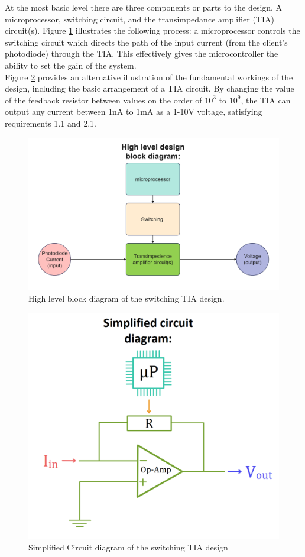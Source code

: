 \documentclass[conference]{IEEEtran}
\begin{document}
At the most basic level there are three components or parts to the design. A microprocessor, switching circuit, and the transimpedance amplifier (TIA) circuit(s). Figure \ref{fig:1} illustrates the following process: a microprocessor controls the switching circuit which directs the path of the input current (from the client’s photodiode) through the TIA. This effectively gives the microcontroller the ability to set the gain of the system. \\

Figure \ref{fig:2} provides an alternative illustration of the fundamental workings of the design, including the basic arrangement of a TIA circuit. By changing the value of the feedback resistor between values on the order of $10^3$ to $10^9$, the TIA can output any current between 1nA to 1mA as a 1-10V voltage, satisfying requirements 1.1 and 2.1.

\begin{figure}
    \centering
    \includegraphics[width=0.8\linewidth]{ENGR302_TIA_blockl_diagram_v2.png}
    \caption{High level block diagram of the switching TIA design.}
    \label{fig:1}
\end{figure}

\begin{figure}
    \centering
    \includegraphics[width=0.8\linewidth]{Simplified_Circuit_Diagramv2.png}
    \caption{Simplified Circuit diagram of the switching TIA design}
    \label{fig:2}
\end{figure}
\end{document}
